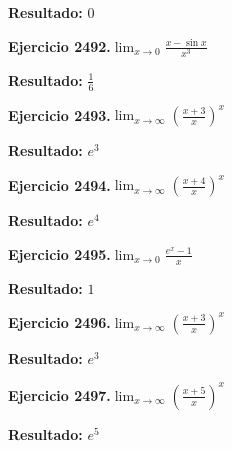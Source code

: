\documentclass[10pt,a4paper]{article}
\begin{document}
\begin{solbox}
\textbf{Resultado:} \(\displaystyle 0\)
\end{solbox}

\begin{ejbox}
\textbf{Ejercicio 2492.}\quad $\lim_{x\to 0} \frac{x-\sin x}{x^3}$
\end{ejbox}

\begin{solbox}
\textbf{Resultado:} \(\displaystyle \frac{1}{6}\)
\end{solbox}

\newpage
\begin{ejbox}
\textbf{Ejercicio 2493.}\quad $\lim_{x\to \infty} \left(\frac{x+3}{x}\right)^{x}$
\end{ejbox}

\begin{solbox}
\textbf{Resultado:} \(\displaystyle e^{3}\)
\end{solbox}

\begin{ejbox}
\textbf{Ejercicio 2494.}\quad $\lim_{x\to \infty} \left(\frac{x+4}{x}\right)^{x}$
\end{ejbox}

\begin{solbox}
\textbf{Resultado:} \(\displaystyle e^{4}\)
\end{solbox}

\begin{ejbox}
\textbf{Ejercicio 2495.}\quad $\lim_{x\to 0} \frac{e^x-1}{x}$
\end{ejbox}

\begin{solbox}
\textbf{Resultado:} \(\displaystyle 1\)
\end{solbox}

\newpage
\begin{ejbox}
\textbf{Ejercicio 2496.}\quad $\lim_{x\to \infty} \left(\frac{x+3}{x}\right)^{x}$
\end{ejbox}

\begin{solbox}
\textbf{Resultado:} \(\displaystyle e^{3}\)
\end{solbox}

\begin{ejbox}
\textbf{Ejercicio 2497.}\quad $\lim_{x\to \infty} \left(\frac{x+5}{x}\right)^{x}$
\end{ejbox}

\begin{solbox}
\textbf{Resultado:} \(\displaystyle e^{5}\)
\end{solbox}
\end{document}
